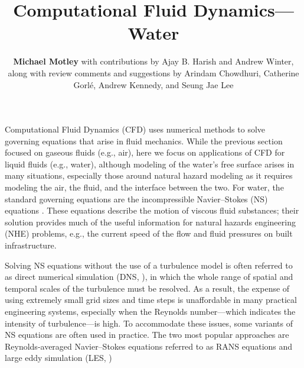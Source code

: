 %
%
%


\title{Computational Fluid Dynamics---Water}
\author{
    \textbf{Michael Motley}
    with contributions by Ajay B. Harish and Andrew Winter,
    \newline
    along with review comments and suggestions by Arindam Chowdhuri, Catherine Gorlé, Andrew Kennedy, and Seung Jae Lee
}
\tocauthor{}
%
%
\maketitle

Computational Fluid Dynamics (CFD) uses numerical methods to solve governing equations that arise in fluid mechanics. While the previous section focused on gaseous fluids (e.g., air), here we focus on applications of CFD for liquid fluids (e.g., water), although modeling of the water's free surface arises in many situations, especially those around natural hazard modeling as it requires modeling the air, the fluid, and the interface between the two. For water, the standard governing equations are the incompressible Navier--Stokes (NS) equations \citep{Darrigol2005navier}. These equations describe the motion of viscous fluid substances; their solution provides much of the useful information for natural hazards engineering (NHE) problems, e.g., the current speed of the flow and fluid pressures on built infrastructure.

Solving NS equations without the use of a turbulence model is often referred to as direct numerical simulation (DNS,   \cite{Orszag1970DNS}), in which the whole range of spatial and temporal scales of the turbulence must be resolved. As a result, the expense of using extremely small grid sizes and time steps is unaffordable in many practical engineering systems, especially when the Reynolds number---which indicates the intensity of turbulence---is high. To accommodate these issues, some variants of NS equations are often used in practice. The two most popular approaches are Reynolds-averaged Navier--Stokes equations referred to as RANS equations  \citep{Reynolds1895RANS, Chou1945RANS} and large eddy simulation (LES, \cite{Deardorff1970LES})

